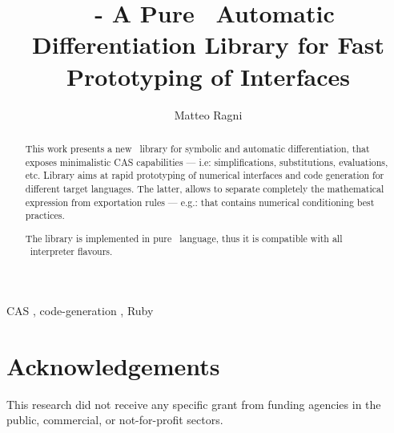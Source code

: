 \documentclass[preprint, 12pt, a4paper,review]{elsarticle}
\begin{document}
\begin{frontmatter}

\title{\ragnicas~- A Pure \Ruby~Automatic Differentiation Library for Fast Prototyping of Interfaces}

\author[ragni]{Matteo Ragni}
\address[ragni]{Department of Industrial Engineering, University of Trento, 9, Sommarive, Povo di Trento, Italy}

\begin{abstract}

This work presents a new \Ruby~library for symbolic and automatic differentiation, that exposes minimalistic CAS capabilities --- i.e: simplifications, substitutions, evaluations, etc. Library aims at rapid prototyping of numerical interfaces and code generation for different target languages. The latter, allows to separate completely the mathematical expression from exportation rules --- e.g.: that contains numerical conditioning best practices.

The library is implemented in pure \Ruby~language, thus it is compatible with all \Ruby~interpreter flavours.

\end{abstract}

\begin{keyword}
CAS \sep{} code-generation \sep{} Ruby
\end{keyword}

\end{frontmatter}

\linenumbers{}








\section*{Acknowledgements}
\label{sec:acknowledgements}
This research did not receive any specific grant from funding agencies in the public, commercial, or not-for-profit sectors.
\end{document}
